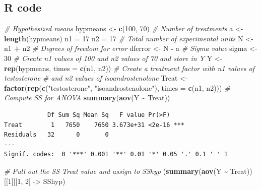 \documentclass[
]{article}
\newenvironment{Shaded}{\begin{snugshade}}{\end{snugshade}}
\newcommand{\AttributeTok}[1]{\textcolor[rgb]{0.13,0.29,0.53}{#1}}
\newcommand{\CommentTok}[1]{\textcolor[rgb]{0.56,0.35,0.01}{\textit{#1}}}
\newcommand{\DecValTok}[1]{\textcolor[rgb]{0.00,0.00,0.81}{#1}}
\newcommand{\FunctionTok}[1]{\textcolor[rgb]{0.13,0.29,0.53}{\textbf{#1}}}
\newcommand{\NormalTok}[1]{#1}
\newcommand{\OtherTok}[1]{\textcolor[rgb]{0.56,0.35,0.01}{#1}}
\newcommand{\SpecialCharTok}[1]{\textcolor[rgb]{0.81,0.36,0.00}{\textbf{#1}}}
\newcommand{\StringTok}[1]{\textcolor[rgb]{0.31,0.60,0.02}{#1}}
\begin{document}
\hypertarget{r-code-3}{%
\subsection*{R code}\label{r-code-3}}

\begin{Shaded}
\begin{Highlighting}[]
\CommentTok{\# Hypothesized means}
\NormalTok{hypmeans }\OtherTok{\textless{}{-}} \FunctionTok{c}\NormalTok{(}\DecValTok{100}\NormalTok{, }\DecValTok{70}\NormalTok{)}
\CommentTok{\# Number of treatments}
\NormalTok{a }\OtherTok{\textless{}{-}} \FunctionTok{length}\NormalTok{(hypmeans) }
\NormalTok{n1 }\OtherTok{=} \DecValTok{17}
\NormalTok{n2 }\OtherTok{=} \DecValTok{17}
\CommentTok{\# Total number of experimental units}
\NormalTok{N }\OtherTok{\textless{}{-}}\NormalTok{ n1 }\SpecialCharTok{+}\NormalTok{ n2 }
\CommentTok{\# Degrees of freedom for error}
\NormalTok{dferror }\OtherTok{\textless{}{-}}\NormalTok{ N }\SpecialCharTok{{-}}\NormalTok{ a}
\CommentTok{\# Sigma value}
\NormalTok{sigma }\OtherTok{\textless{}{-}} \DecValTok{30}
\CommentTok{\# Create n1 values of 100 and n2 values of 70 and store in Y}
\NormalTok{Y }\OtherTok{\textless{}{-}} \FunctionTok{rep}\NormalTok{(hypmeans, }\AttributeTok{times =} \FunctionTok{c}\NormalTok{(n1, n2))}
\CommentTok{\# Create a treatment factor with n1 values of testosterone }
\CommentTok{\# and n2 values of isoandrostenolone}
\NormalTok{Treat }\OtherTok{\textless{}{-}} \FunctionTok{factor}\NormalTok{(}\FunctionTok{rep}\NormalTok{(}\FunctionTok{c}\NormalTok{(}\StringTok{"testosterone"}\NormalTok{, }\StringTok{"isoandrostenolone"}\NormalTok{), }
                    \AttributeTok{times =} \FunctionTok{c}\NormalTok{(n1, n2)))}
\CommentTok{\# Compute SS for ANOVA}
\FunctionTok{summary}\NormalTok{(}\FunctionTok{aov}\NormalTok{(Y }\SpecialCharTok{\textasciitilde{}}\NormalTok{ Treat))}
\end{Highlighting}
\end{Shaded}

\begin{verbatim}
            Df Sum Sq Mean Sq   F value Pr(>F)    
Treat        1   7650    7650 3.673e+31 <2e-16 ***
Residuals   32      0       0                     
---
Signif. codes:  0 '***' 0.001 '**' 0.01 '*' 0.05 '.' 0.1 ' ' 1
\end{verbatim}

\begin{Shaded}
\begin{Highlighting}[]
\CommentTok{\# Pull out the SS Treat value and assign to SShyp}
\NormalTok{(}\FunctionTok{summary}\NormalTok{(}\FunctionTok{aov}\NormalTok{(Y }\SpecialCharTok{\textasciitilde{}}\NormalTok{ Treat))[[}\DecValTok{1}\NormalTok{]][}\DecValTok{1}\NormalTok{, }\DecValTok{2}\NormalTok{] }\OtherTok{{-}\textgreater{}}\NormalTok{ SShyp) }
\end{Highlighting}
\end{Shaded}
\end{document}
